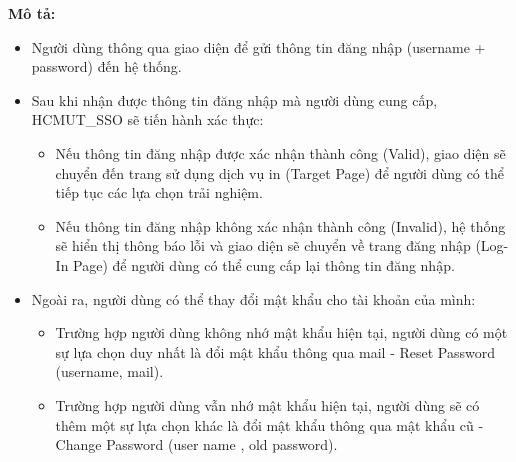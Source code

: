     \newpage
    \textbf{Mô tả:}
    \begin{itemize}
    \item Người dùng thông qua giao diện để gửi thông tin đăng nhập (username + password) đến hệ thống.
    \item Sau khi nhận được thông tin đăng nhập mà người dùng cung cấp, HCMUT\_SSO sẽ tiến hành xác thực:
        \begin{itemize}
            \item Nếu thông tin đăng nhập được xác nhận thành công (Valid), giao diện sẽ chuyển đến trang sử dụng dịch vụ in (Target Page) để người dùng có thể tiếp tục các lựa chọn trải nghiệm.
            \item Nếu thông tin đăng nhập không xác nhận thành công (Invalid), hệ thống sẽ hiển thị thông báo lỗi và giao diện sẽ chuyển về trang đăng nhập (Log-In Page) để người dùng có thể cung cấp lại thông tin đăng nhập.
        \end{itemize}
    \item Ngoài ra, người dùng có thể thay đổi mật khẩu cho tài khoản của mình:
        \begin{itemize}
            \item Trường hợp người dùng không nhớ mật khẩu hiện tại, người dùng có một sự lựa chọn duy nhất là đổi mật khẩu thông qua mail - Reset Password (username, mail).
            \item Trường hợp người dùng vẫn nhớ mật khẩu hiện tại, người dùng sẽ có thêm một sự lựa chọn khác là đổi mật khẩu thông qua mật khẩu cũ - Change Password (user name , old password).
        \end{itemize}
    \end{itemize}